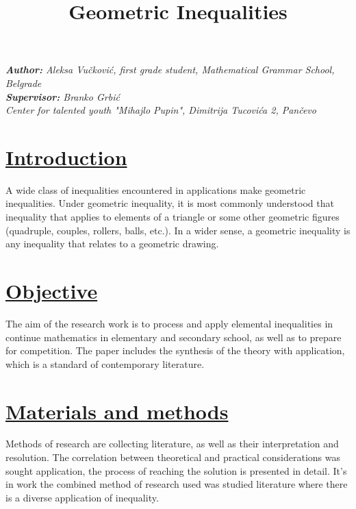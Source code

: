 \documentclass{article}
\title{\textbf{\huge Geometric Inequalities}}
\date{}
\author{}
\begin{document}
\setlength{\columnsep}{1.2cm}
\maketitle
\begin{center}
\vspace*{-1.5cm}
 \large\textit{\textbf{Author:} Aleksa Vu\v ckovi\'c, first grade student, Mathematical Grammar School, Belgrade}\\
    \textit{\textbf{Supervisor:} Branko Grbi\'c}\\
    \normalsize\textit{Center for talented youth "Mihajlo Pupin", Dimitrija Tucovi\'ca 2, Pan\v cevo}
\end{center}
\begin{multicols}{2}
 \noindent
\section*{\underline{Introduction}}

\large A wide class of inequalities encountered in applications make geometric \text inequalities. Under geometric inequality, it is most commonly understood that inequality that \text applies to elements of a triangle or some other geometric figures (quadruple, couples, rollers, balls, etc.). In a wider sense, a geometric inequality is any inequality that \text relates to a geometric drawing.

\section*{\underline{Objective}}

The aim of the research work is to process and apply elemental inequalities in
continue mathematics in elementary and \text secondary school, as well as to prepare for
\text competition. The paper includes the synthesis of the \text theory with application, which is a standard of contemporary literature.

\section*{\underline{Materials and methods}}

Methods of research are collecting \text literature, as well as their interpretation and \text resolution.
The correlation between \text theoretical and practical considerations was sought
\text application, the process of \text reaching the solution is presented in detail. It's in work
the combined method of research used was studied
literature where there is a \text diverse application of inequality.
\noindent


\end{multicols}
\end{document}
